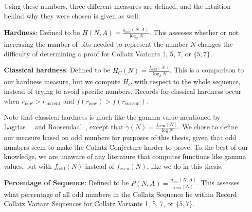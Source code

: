 Using these numbers, three different measures are defined, and the intuition behind why they were chosen is given as well: \par
\textbf{Hardness}: Defined to be $H(N,A) = \frac{g_\text{odd}(N,A)}{\log_2{N}}$. This assesses whether or not increasing the number of bits needed to represent the number $N$ changes the difficulty of determining a proof for Collatz Variants  1, 5, 7, or $\{5,7\}$.  \par
\textbf{Classical hardness}: Defined to be $H_C(N) = \frac{f_\text{odd}(N)}{\log_2{N}}$. This is a comparison to our hardness measure, but we compute $H_C$ with respect to the whole sequence, instead of trying to avoid specific numbers. Records for classical hardness occur when $r_\text{new} > r_\text{current}$ and $f(r_\text{new}) > f(r_\text{current})$. \par
Note that classical hardness is much like the gamma value mentioned by Lagrias~\cite{2003mathLagrais}~\cite{2006mathLagrias} and Roosendaal~\cite{EricRoose}, except that $\gamma(N) = \frac{f_\text{even}(N)}{\log{N}}$. We chose to define our measure based on odd numbers for purposes of this thesis, given that odd numbers seem to make the Collatz Conjecture harder to prove. To the best of our knowledge, we are unaware of any literature that computes functions like gamma values, but with $f_\text{odd}(N)$ instead of $f_\text{even}(N)$, like we do in this thesis.\par
\textbf{Percentage of Sequence}: Defined to be $P(N,A) = \frac{g_\text{odd}(N,A)}{f_\text{odd}(N)}$. This assesses what percentage of all odd numbers in the Collatz Sequence lie within Record Collatz Variant Sequences for Collatz Variants 1, 5, 7, or $\{5,7\}$.

